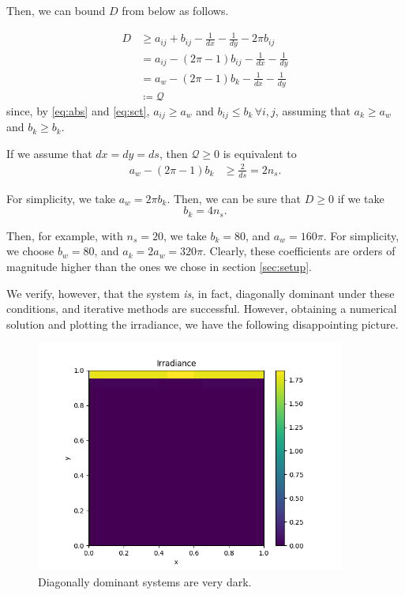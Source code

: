 \documentclass[10pt]{article}
\newcommand\QQ{\mathcal{Q}}
\begin{document}
\begin{multicols}{2}

Then, we can bound $D$ from below as follows.

\begin{align}
	D &\geq a_{ij} + b_{ij} - \frac{1}{dx} - \frac{1}{dy}
	- 2\pi b_{ij} \\
	&= a_{ij} - (2\pi - 1)b_{ij} - \frac{1}{dx} - \frac{1}{dy} \\
	&= a_w - (2\pi - 1)b_k - \frac{1}{dx} - \frac{1}{dy} \\
	&\coloneqq \QQ 
\end{align}
since, by \eqref{eq:abs} and \eqref{eq:sct}, $a_{ij} \geq a_w$ and $b_{ij} \leq b_k \, \forall i,j$, assuming that $a_k \geq a_w$ and $b_k \geq b_k$.

If we assume that $dx=dy=ds$, then $\QQ \geq 0$ is equivalent to
\begin{align*}
	a_w - (2\pi - 1)b_k &\geq \frac{2}{ds} = 2n_s.
\end{align*}

For simplicity, we take $a_w=2\pi b_k$. Then, we can be sure that $D \geq 0$ if we take
\begin{equation}
	b_k = 4n_s.
\end{equation}

Then, for example, with $n_s=20$, we take $b_k = 80$, and $a_w = 160\pi$.
For simplicity, we choose $b_w = 80$, and $a_k=2a_w = 320\pi$.
Clearly, these coefficients are orders of magnitude higher than the ones we chose in section \ref{sec:setup}.

We verify, however, that the system \textit{is}, in fact, diagonally dominant under these conditions, and iterative methods are successful.
However, obtaining a numerical solution and plotting the irradiance, we have the following disappointing picture.
\vspace{-1em}
\begin{figure}[H]
	\centering
	\includegraphics[width=4in]{img/ddom.png}
	\caption{Diagonally dominant systems are very dark.}
\end{figure}


\end{multicols}
\end{document}
